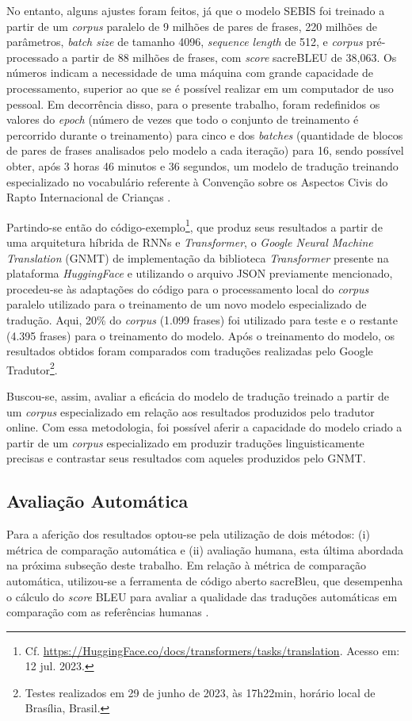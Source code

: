 \documentclass[portuguese]{textolivre}
\begin{document}
No entanto, alguns ajustes foram feitos, já que o modelo SEBIS foi treinado a partir de um \textit{corpus} paralelo de 9 milhões de pares de frases, 220 milhões de parâmetros, \textit{batch size} de tamanho 4096, \textit{sequence length} de 512, e \textit{corpus} pré-processado a partir de 88 milhões de frases, com \textit{score} sacreBLEU de 38,063. Os números indicam a necessidade de uma máquina com grande capacidade de processamento, superior ao que se é possível realizar em um computador de uso pessoal. Em decorrência disso, para o presente trabalho, foram redefinidos os valores do \textit{epoch} (número de vezes que todo o conjunto de treinamento é percorrido durante o treinamento) para cinco e dos \textit{batches} (quantidade de blocos de pares de frases analisados pelo modelo a cada iteração) para 16, sendo possível obter, após 3 horas 46 minutos e 36 segundos, um modelo de tradução treinando especializado no vocabulário referente à Convenção sobre os Aspectos Civis do Rapto Internacional de Crianças \cite{hcch_convention_1980}.

Partindo-se então do código-exemplo\footnote{Cf. \url{https://HuggingFace.co/docs/transformers/tasks/translation}. Acesso em: 12 jul. 2023.}, que produz seus resultados a partir de uma arquitetura híbrida de RNNs e \textit{Transformer}, o \textit{Google Neural Machine Translation} (GNMT) \cite{wu_googles_2016} de implementação da biblioteca \textit{Transformer} presente na plataforma \textit{HuggingFace} e utilizando o arquivo JSON previamente mencionado, procedeu-se às adaptações do código para o processamento local do \textit{corpus} paralelo utilizado para o treinamento de um novo modelo especializado de tradução. Aqui, 20\% do \textit{corpus} (1.099 frases) foi utilizado para teste e o restante (4.395 frases) para o treinamento do modelo. Após o treinamento do modelo, os resultados obtidos foram comparados com traduções realizadas pelo Google Tradutor\footnote{Testes realizados em 29 de junho de 2023, às 17h22min, horário local de Brasília, Brasil.}.

Buscou-se, assim, avaliar a eficácia do modelo de tradução treinado a partir de um \textit{corpus} especializado em relação aos resultados produzidos pelo tradutor online. Com essa metodologia, foi possível aferir a capacidade do modelo criado a partir de um \textit{corpus} especializado em produzir traduções linguisticamente precisas e contrastar seus resultados com aqueles produzidos pelo GNMT.

\subsection{Avaliação Automática}\label{sec-fmt-manuscrito}
Para a aferição dos resultados optou-se pela utilização de dois métodos: (i) métrica de comparação automática e (ii) avaliação humana, esta última abordada na próxima subseção deste trabalho. Em relação à métrica de comparação automática, utilizou-se a ferramenta de código aberto sacreBleu, que desempenha o cálculo do \textit{score} BLEU para avaliar a qualidade das traduções automáticas em comparação com as referências humanas \cite{post_call_2018,papineni_bleu:_2002}.
\end{document}
